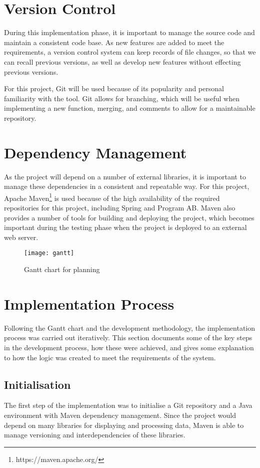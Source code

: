 \section{Version Control}
During this implementation phase, it is important to manage the source code and maintain a consistent code base. As new features are added to meet the requirements, a version control system can keep records of file changes, so that we can recall previous versions, as well as develop new features without effecting previous versions.

For this project, Git will be used because of its popularity and personal familiarity with the tool. Git allows for branching, which will be useful when implementing a new function, merging, and comments to allow for a maintainable repository.

\section{Dependency Management}
As the project will depend on a number of external libraries, it is important to manage these dependencies in a consistent and repeatable way. For this project, Apache Maven\footnote{https://maven.apache.org/} is used because of the high availability of the required repositories for this project, including Spring and Program AB. Maven also provides a number of tools for building and deploying the project, which becomes important during the testing phase when the project is deployed to an external web server.

\begin{landscape}
	\begin{figure}[h]
		\centering
		\texttt{[image: gantt]}
		\caption{Gantt chart for planning}
		\label{fig:gantt}
	\end{figure}
\end{landscape}



\section{Implementation Process}
Following the Gantt chart and the development methodology, the implementation process was carried out iteratively. This section documents some of the key steps in the development process, how these were achieved, and gives some explanation to how the logic was created to meet the requirements of the system.

\subsection{Initialisation}
The first step of the implementation was to initialise a Git repository and a Java environment with Maven dependency management. Since the project would depend on many libraries for displaying and processing data, Maven is able to manage versioning and interdependencies of these libraries.

